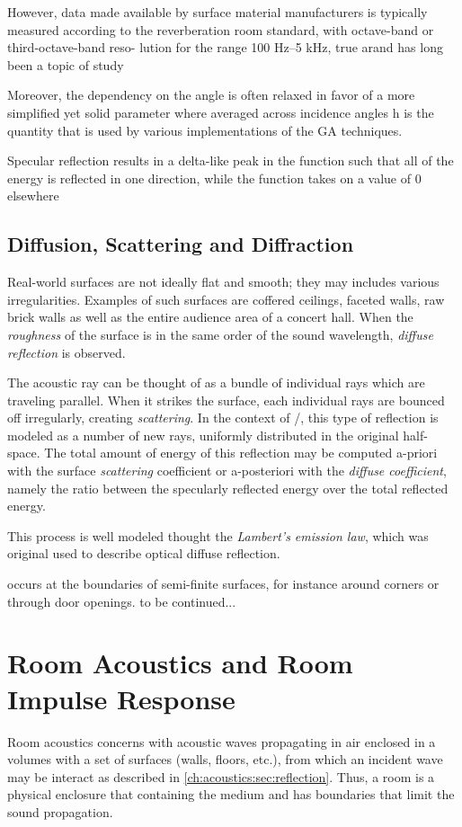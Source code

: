 However, data made available by surface material manufacturers is typically measured according to the reverberation room standard, with octave-band or third-octave-band reso- lution for the range 100 Hz–5 kHz,
true arand has long been a topic of study

Moreover, the dependency on the angle is often relaxed in favor of a more simplified yet solid parameter where
averaged across incidence angles h is the quantity that is used by various implementations of the GA techniques.

Specular reflection results in a delta-like peak in the function such that all of the energy is reflected in one direction, while the function takes on a value of 0 elsewhere

\subsection{Diffusion, Scattering and Diffraction}
Real-world surfaces are not ideally flat and smooth; they may includes various irregularities.
Examples of such surfaces are coffered ceilings, faceted walls, raw brick walls as well as the entire audience area of a concert hall.
When the \textit{roughness} of the surface is in the same order of the sound wavelength, \textit{diffuse reflection} is observed.

The acoustic ray can be thought of as a bundle of individual rays which are traveling parallel.
When it strikes the surface, each individual rays are bounced off irregularly, creating \textit{scattering}.
In the context of \GA/, this type of reflection is modeled as a number of new rays, uniformly distributed in the original half-space.
The total amount of energy of this reflection may be computed a-priori with the surface \textit{scattering} coefficient
or a-posteriori with the \textit{diffuse coefficient}, namely the ratio between
the specularly reflected energy over the total reflected energy.

This process is well modeled thought the \textit{Lambert's emission law}, which was original used to describe optical diffuse reflection.

 occurs at the boundaries of semi-finite surfaces, for instance around corners or through door openings.
to be continued...



\section{Room Acoustics and Room Impulse Response}\label{ch:acoustics:sec:rir}
Room acoustics concerns with acoustic waves propagating in air enclosed in a volumes with a set of surfaces
(walls, floors, etc.), from which an incident wave may be interact as described in \cref{ch:acoustics:sec:reflection}.
Thus, a room is a physical enclosure that containing the medium and has boundaries that limit the sound propagation.

